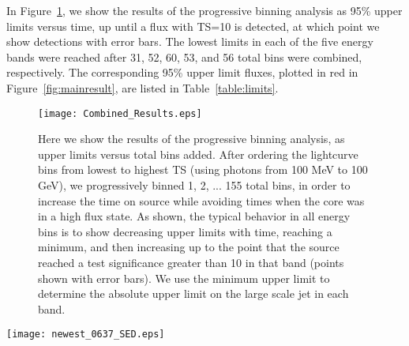 \documentclass[twocolumn]{aastex61}
\begin{document}
In Figure~\ref{fig:newcurves}, we show the results of the progressive
binning analysis as 95\% upper limits versus time, up until a flux with
TS=10 is detected, at which point we show detections with error
bars. The lowest limits in each of the five energy bands were reached
after 31, 52, 60, 53, and 56 total bins were combined, respectively.
The corresponding 95\% upper limit fluxes, plotted in red in
Figure~\ref{fig:mainresult}, are listed in Table~\ref{table:limits}.


\begin{figure}[t]
\vspace{20pt}
\begin{center}
\texttt{[image: Combined\_Results.eps]}
\end{center}
\caption{\label{fig:newcurves} Here we show the results of the progressive binning analysis, as upper limits versus total bins added.  After ordering the lightcurve bins from lowest to highest TS (using photons from 100 MeV to 100 GeV), we progressively binned 1, 2, ... 155 total bins, in order to increase the time on source while avoiding times when the core was in a high flux state.  As shown, the typical behavior in all energy bins is to show decreasing upper limits with time, reaching a minimum, and then increasing up to the point that the source reached a test significance greater than 10 in that band (points shown with error bars).  We use the minimum upper limit to determine the absolute upper limit on the large scale jet in each band. }
\end{figure}

\begin{figure*}[t]
\begin{center}
\texttt{[image: newest\_0637\_SED.eps]}
\end{center}
\caption{\label{fig:mainresult} Here we show the SEDs for the four
  brightest knots (black points and lines) and the X-ray brightest
  know wk8.9 (cyan points and lines).  The new ALMA fluxes are plotted
  in dark yellow. The green open circles and dashed curves are taken
  from L17 -- note the discrepancy with the observed
  radio, ALMA, and IR fluxes.  At upper right, the new Fermi upper limits
  are plotted in magenta (previous limits from M15 are shown in grey
  for comparison). The new upper limits rule out the IC/CMB model curves
  (thick black and cyan lines) at an 8.7$\sigma$ level for the
  combined four brightest knots and at the 5.3$\sigma$ level for the
  single knot wk8.9. The red dashed curve is the result of using the simple shift formula on the synchrotron curve of L17 for knot wk8.9. }
\end{figure*}
\end{document}
